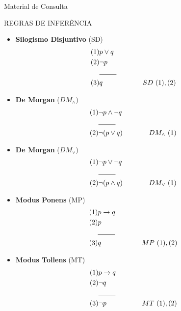 \documentclass[11pt,a4paper,oneside]{article}
\begin{document}
\newpage

{\sc \huge Material de Consulta}

\vspace{2cm}

REGRAS DE INFERÊNCIA

\begin{multicols}{2}
\begin{itemize}
	\item {\bf Silogismo Disjuntivo} (SD)
	\begin{eqnarray*}
		(1) & p \vee q& \\
		(2) & \neg p& \\
		 & \line(1,0){25} & \\
		(3) & q & \hspace{1cm} SD \mbox{ } (1),(2)
	\end{eqnarray*}
	\item {\bf De Morgan} ($DM_\wedge$)
			\begin{eqnarray*}
				(1) & \neg p \wedge \neg q & \\
				 & \line(1,0){25} & \\
				(2) & \neg (p \vee q) & \hspace{1cm} DM_\wedge \mbox{ } (1)
			\end{eqnarray*}
			
	\item {\bf De Morgan} ($DM_\vee$)
			\begin{eqnarray*}
				(1) & \neg p \vee \neg q & \\
				 & \line(1,0){25} & \\
				(2) &  \neg (p \wedge q) & \hspace{1cm} DM_\vee \mbox{ } (1)
			\end{eqnarray*}
\end{itemize}

\columnbreak

\begin{itemize}
	\item {\bf Modus Ponens} (MP)
	\begin{eqnarray*}
		(1) & p \rightarrow q & \\
		(2) & p & \\
		 & \line(1,0){25} & \\
		(3) & q & \hspace{1cm} MP \mbox{ } (1),(2)
	\end{eqnarray*}
	\item {\bf Modus Tollens} (MT)
			\begin{eqnarray*}
				(1) & p \rightarrow q & \\
				(2) & \neg q & \\
				 & \line(1,0){25} & \\
				(3) & \neg p & \hspace{1cm} MT \mbox{ } (1),(2)
			\end{eqnarray*}
			

\end{itemize}
\end{multicols}
\end{document}
